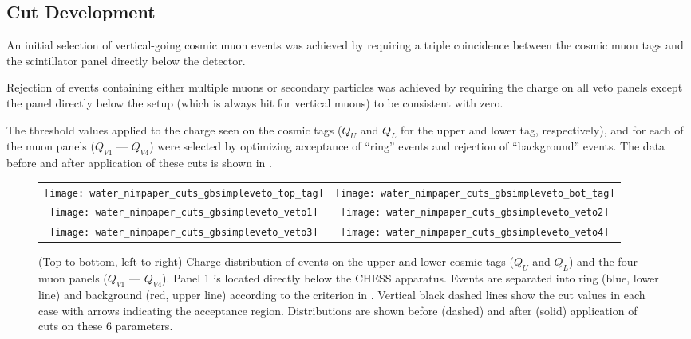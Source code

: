 \subsection{Cut Development}\label{s:cut}
An initial selection of vertical-going cosmic muon events was achieved by requiring a triple coincidence between the cosmic muon tags and the scintillator panel directly below the detector.  

Rejection of events containing either multiple muons or secondary particles was achieved by requiring the charge on all veto panels except the panel directly below the setup (which is always hit for vertical muons) to be consistent with zero.  

The threshold values applied to the charge seen on the cosmic tags ($Q_U$ and $Q_L$ for the upper and lower tag, respectively), and for each of the muon panels ($Q_{V1}$ --- $Q_{V4}$) were selected by optimizing acceptance of ``ring'' events and rejection of ``background'' events.  
The data before and after application of these cuts is shown in .

\begin{figure*}
\centering
\begin{tabular}{cc}
\texttt{[image: water\_nimpaper\_cuts\_gbsimpleveto\_top\_tag]} &
\texttt{[image: water\_nimpaper\_cuts\_gbsimpleveto\_bot\_tag]} \\
\texttt{[image: water\_nimpaper\_cuts\_gbsimpleveto\_veto1]} &
\texttt{[image: water\_nimpaper\_cuts\_gbsimpleveto\_veto2]} \\
\texttt{[image: water\_nimpaper\_cuts\_gbsimpleveto\_veto3]} &
\texttt{[image: water\_nimpaper\_cuts\_gbsimpleveto\_veto4]} \\
\end{tabular}
\caption{(Top to bottom, left to right) Charge distribution of events on the upper and lower cosmic tags ($Q_U$ and $Q_L$) and the four muon panels ($Q_{V1}$ --- $Q_{V4}$).  Panel 1 is located directly below the CHESS apparatus.  Events are separated into ring (blue, lower line) and background (red, upper line) according to the criterion in .  Vertical black dashed lines show the cut values in each case with arrows indicating the acceptance region.  Distributions are shown before (dashed) and after (solid) application of cuts on these 6 parameters.}
\label{fig:event-selection-cuts}
\end{figure*}

